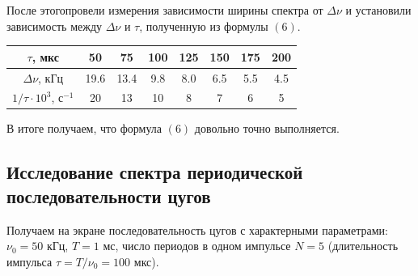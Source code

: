 \documentclass[a4paper,12pt]{article}
\begin{document}
После этогопровели измерения зависимости ширины спектра от $\Delta \nu$ и установили зависимость между $\Delta \nu$ и $\tau$, полученную из формулы $(6)$.
\begin{center}
\begin{tabular}{|c|c|c|c|c|c|c|c|}
\hline
$\tau$, мкс & 50 & 75 & 100 & 125 & 150 & 175 & 200 \\ \hline
$\Delta \nu$, кГц & 19.6 & 13.4 & 9.8 & 8.0 & 6.5 & 5.5 & 4.5 \\ \hline
$1/\tau \cdot 10^3$, с$^{-1}$ & 20 & 13 & 10 & 8 & 7 & 6 & 5 \\ \hline
\end{tabular}
\end{center}
\begin{center}
\end{center}
В итоге получаем, что формула $(6)$ довольно точно выполняется.
\newpage
\subsection*{Исследование спектра периодической последовательности цугов}
Получаем на экране последовательность цугов с характерными параметрами: $\nu_0 = 50$ кГц, $T = 1$ мс, число периодов в одном импульсе $N = 5$ (длительность импульса $\tau = T/\nu_0 = 100$ мкс).
\end{document}
